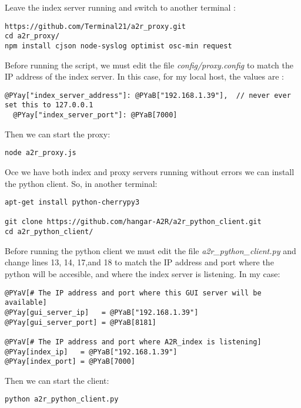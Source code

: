 \documentclass{article}
\begin{document}
Leave the index server running and switch to another terminal :

\begin{Verbatim}
https://github.com/Terminal21/a2r_proxy.git
cd a2r_proxy/
npm install cjson node-syslog optimist osc-min request
\end{Verbatim}

Before running the script, we must edit the file \emph{config/proxy.config} to match the IP address of the index server. In this case, for my local host, the values are : 

\begin{Verbatim}[commandchars=@\[\]]
  @PYay["index_server_address"]: @PYaB["192.168.1.39"],  // never ever set this to 127.0.0.1
  @PYay["index_server_port"]: @PYaB[7000]
\end{Verbatim}

Then we can start the proxy:

\begin{Verbatim}
node a2r_proxy.js
\end{Verbatim}

Oce we have both index and proxy servers running without errors we can install the python client. So, in another terminal:

\begin{Verbatim}
apt-get install python-cherrypy3

git clone https://github.com/hangar-A2R/a2r_python_client.git
cd a2r_python_client/
\end{Verbatim}

Before running the python client we must edit the file \emph{a2r\_python\_client.py} and change lines 13, 14, 17,and 18 to match the IP address and port where the python will be accesible, and where the index server is listening. In my case: 

\begin{Verbatim}[commandchars=@\[\]]
@PYaV[# The IP address and port where this GUI server will be available]
@PYay[gui_server_ip]   = @PYaB["192.168.1.39"]
@PYay[gui_server_port] = @PYaB[8181]

@PYaV[# The IP address and port where A2R_index is listening]
@PYay[index_ip]   = @PYaB["192.168.1.39"]
@PYay[index_port] = @PYaB[7000]
\end{Verbatim}

Then we can start the client:

\begin{Verbatim}
python a2r_python_client.py
\end{Verbatim}
\end{document}
